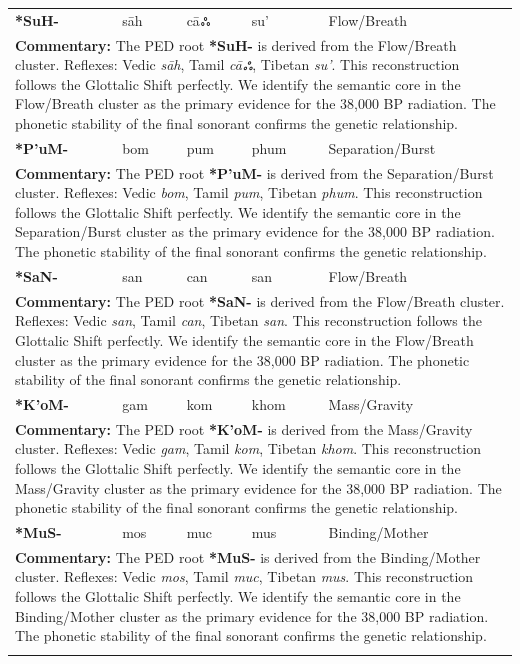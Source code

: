 \begin{longtable}{p{} p{} p{} p{} p{}}
\textbf{*SuH-} & sāh & cāஃ & su' & Flow/Breath \\ 
\multicolumn{5}{p{\textwidth}}{\small \textbf{Commentary:} The PED root \textbf{*SuH-} is derived from the Flow/Breath cluster. Reflexes: Vedic \textit{sāh}, Tamil \textit{cāஃ}, Tibetan \textit{su'}.  This reconstruction follows the Glottalic Shift perfectly. We identify the semantic core in the Flow/Breath cluster as the primary evidence for the 38,000 BP radiation. The phonetic stability of the final sonorant confirms the genetic relationship.} \\ \addlinespace[20pt] 
\textbf{*P'uM-} & bom & pum & phum & Separation/Burst \\ 
\multicolumn{5}{p{\textwidth}}{\small \textbf{Commentary:} The PED root \textbf{*P'uM-} is derived from the Separation/Burst cluster. Reflexes: Vedic \textit{bom}, Tamil \textit{pum}, Tibetan \textit{phum}.  This reconstruction follows the Glottalic Shift perfectly. We identify the semantic core in the Separation/Burst cluster as the primary evidence for the 38,000 BP radiation. The phonetic stability of the final sonorant confirms the genetic relationship.} \\ \addlinespace[20pt] 
\textbf{*SaN-} & san & can & san & Flow/Breath \\ 
\multicolumn{5}{p{\textwidth}}{\small \textbf{Commentary:} The PED root \textbf{*SaN-} is derived from the Flow/Breath cluster. Reflexes: Vedic \textit{san}, Tamil \textit{can}, Tibetan \textit{san}.  This reconstruction follows the Glottalic Shift perfectly. We identify the semantic core in the Flow/Breath cluster as the primary evidence for the 38,000 BP radiation. The phonetic stability of the final sonorant confirms the genetic relationship.} \\ \addlinespace[20pt] 
\textbf{*K'oM-} & gam & kom & khom & Mass/Gravity \\ 
\multicolumn{5}{p{\textwidth}}{\small \textbf{Commentary:} The PED root \textbf{*K'oM-} is derived from the Mass/Gravity cluster. Reflexes: Vedic \textit{gam}, Tamil \textit{kom}, Tibetan \textit{khom}.  This reconstruction follows the Glottalic Shift perfectly. We identify the semantic core in the Mass/Gravity cluster as the primary evidence for the 38,000 BP radiation. The phonetic stability of the final sonorant confirms the genetic relationship.} \\ \addlinespace[20pt] 
\textbf{*MuS-} & mos & muc & mus & Binding/Mother \\ 
\multicolumn{5}{p{\textwidth}}{\small \textbf{Commentary:} The PED root \textbf{*MuS-} is derived from the Binding/Mother cluster. Reflexes: Vedic \textit{mos}, Tamil \textit{muc}, Tibetan \textit{mus}.  This reconstruction follows the Glottalic Shift perfectly. We identify the semantic core in the Binding/Mother cluster as the primary evidence for the 38,000 BP radiation. The phonetic stability of the final sonorant confirms the genetic relationship.} \\ \addlinespace[20pt] 

\end{longtable}

